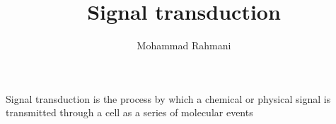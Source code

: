 \documentclass[a4paper]{article}
\title{Signal transduction}
\date{}
\author{Mohammad Rahmani}
\begin{document}
\maketitle
    Signal transduction is the process by which a chemical or physical signal is transmitted through a cell as a series of molecular events 
    
    
\end{document}
